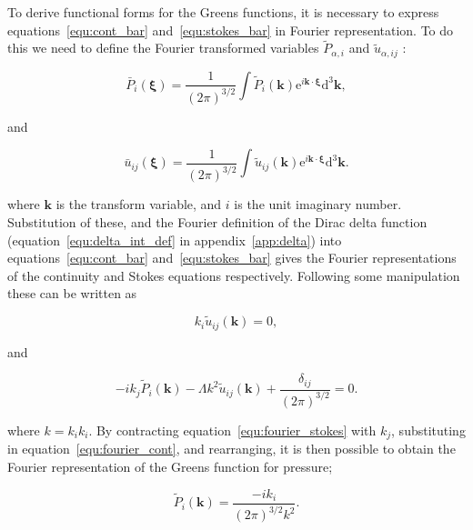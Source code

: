 \documentclass[12pt]{article}
\begin{document}
To derive functional forms for the Greens functions, it is necessary to express equations~\ref{equ:cont_bar} and~\ref{equ:stokes_bar} in Fourier representation. To do this we need to define the Fourier transformed variables $\tilde{P}_{\alpha, i}$ and $\tilde{u}_{\alpha,ij}$ \citep{Riley06}:

\begin{equation}
\label{equ:fourier_p}
\bar{P}_{i} (\boldsymbol\xi) = \frac{1}{(2 \pi)^{3/2}} \int \tilde{P}_{i} (\boldsymbol{k}) \mathrm{e}^{i \boldsymbol{k} \cdot \boldsymbol\xi} \mathrm{d}^{3} \boldsymbol{k} ,
\end{equation}

and 

\begin{equation}
\label{equ:fourier_vel}
\bar{u}_{ij} (\boldsymbol\xi) = \frac{1}{(2 \pi)^{3/2}} \int \tilde{u}_{ij} (\boldsymbol{k}) \mathrm{e}^{i \boldsymbol{k} \cdot \boldsymbol\xi} \mathrm{d}^{3} \boldsymbol{k} .
\end{equation}


where $\boldsymbol{k}$ is the transform variable, and $i$ is the unit imaginary number. Substitution of these, and the Fourier definition of the Dirac delta function (equation~\ref{equ:delta_int_def} in appendix~\ref{app:delta}) into equations~\ref{equ:cont_bar} and~\ref{equ:stokes_bar} gives the Fourier representations of the continuity and Stokes equations respectively. Following some manipulation these can be written as

\begin{equation}
\label{equ:fourier_cont}
k_{i} \tilde{u}_{ij} (\boldsymbol{k}) = 0 ,
\end{equation}

and

\begin{equation}
\label{equ:fourier_stokes}
-i k_{j} \tilde{P}_{i} (\boldsymbol{k}) - \Lambda k^{2} \tilde{u}_{ij} (\boldsymbol{k}) + \frac{\delta_{ij}}{(2 \pi)^{3/2}} = 0 .
\end{equation}

where $k = k_{i} k_{i}$. By contracting equation~\ref{equ:fourier_stokes} with $k_{j}$, substituting in equation~\ref{equ:fourier_cont}, and rearranging, it is then possible to obtain the Fourier representation of the Greens function for pressure;

\begin{equation}
\label{equ:fourier_green_p}
\tilde{P}_{i} (\boldsymbol{k}) = \frac{-i k_{i}}{(2 \pi)^{3/2} k^{2}}.
\end{equation}
\end{document}
